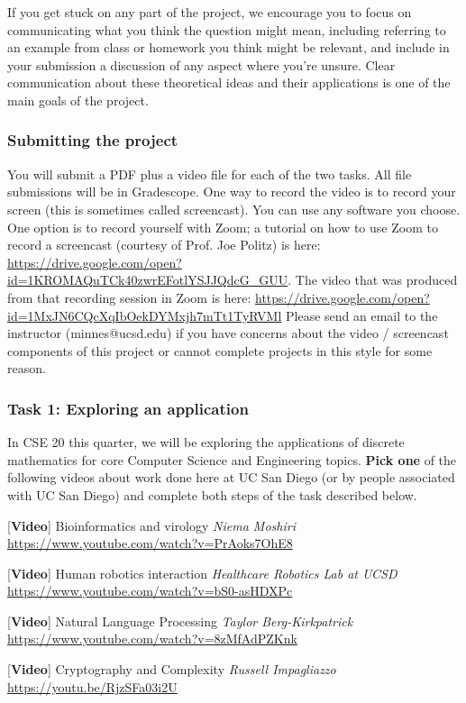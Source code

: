 \documentclass[12pt, oneside]{article}
\begin{document}
If you get stuck on any part of the project, we encourage you to focus on communicating what you think 
the question might mean, including referring to an example from class or homework you think might be relevant, 
and include in your submission a discussion of any aspect where you're unsure. Clear communication about these
theoretical ideas and their applications is one of the main goals of the project.

\subsubsection*{Submitting the project} You will submit a PDF plus a video file for each of the 
two tasks. All file submissions will be in Gradescope. 
One way to record the video is to record your screen (this is sometimes called screencast).
You can use any software you choose. 
One option is to record yourself with Zoom; a tutorial on how to use Zoom to record a 
screencast (courtesy of Prof. Joe Politz)  is here: 
\url{https://drive.google.com/open?id=1KROMAQuTCk40zwrEFotlYSJJQdcG_GUU}.
The video that was produced from that recording session in Zoom is here:
\url{https://drive.google.com/open?id=1MxJN6CQcXqIbOekDYMxjh7mTt1TyRVMl}
Please send an email to the instructor (minnes@ucsd.edu) if you have 
concerns about  the video / screencast components of this project or cannot 
complete projects in this style for some reason.

\subsubsection*{Task 1: Exploring an application}
In CSE 20 this quarter, we will be exploring the applications of discrete mathematics for core Computer
Science and Engineering topics. {\bf Pick one} of the following videos about work done 
here at UC San Diego (or by people associated with UC San Diego) and complete both steps of 
the task described below.


[{\bf Video}] Bioinformatics and virology {\it Niema Moshiri}
{\small \url{https://www.youtube.com/watch?v=PrAoks7OhE8}}

[{\bf Video}] Human robotics interaction {\it Healthcare Robotics Lab at UCSD}
{\small \url{https://www.youtube.com/watch?v=bS0-asHDXPc}}

[{\bf Video}] Natural Language Processing {\it Taylor Berg-Kirkpatrick}
{\small \url{https://www.youtube.com/watch?v=8zMfAdPZKnk}}

[{\bf Video}] Cryptography and Complexity {\it Russell Impagliazzo}
{\small \url{https://youtu.be/RjzSFa03i2U}}
\end{document}
